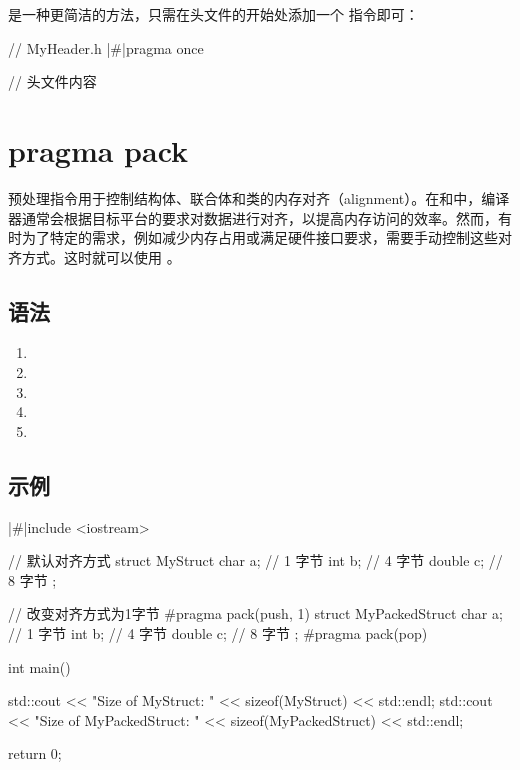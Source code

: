  是一种更简洁的方法，只需在头文件的开始处添加一个  指令即可：
\begin{cpplst}
// MyHeader.h
|\#|pragma once

// 头文件内容

\end{cpplst}

\section{pragma pack}
预处理指令用于控制结构体、联合体和类的内存对齐（alignment）。在和中，编译器通常会根据目标平台的要求对数据进行对齐，以提高内存访问的效率。然而，有时为了特定的需求，例如减少内存占用或满足硬件接口要求，需要手动控制这些对齐方式。这时就可以使用
。
\subsection{语法}
\begin{enumerate}
	\item {}
	\item {}
	\item {}
	\item {}
	\item {}
\end{enumerate}
\vfill

\subsection{示例}
\begin{cpplst}
|\#|include <iostream>

// 默认对齐方式
struct MyStruct {
    char a;    // 1 字节
    int b;     // 4 字节
    double c;  // 8 字节
};

// 改变对齐方式为1字节
#pragma pack(push, 1)
struct MyPackedStruct {
    char a;    // 1 字节
    int b;     // 4 字节
    double c;  // 8 字节
};
#pragma pack(pop)

int main() {
    std::cout << "Size of MyStruct: "
              << sizeof(MyStruct) << std::endl;
    std::cout << "Size of MyPackedStruct: "
              << sizeof(MyPackedStruct) << std::endl;

    return 0;
}
\end{cpplst}
